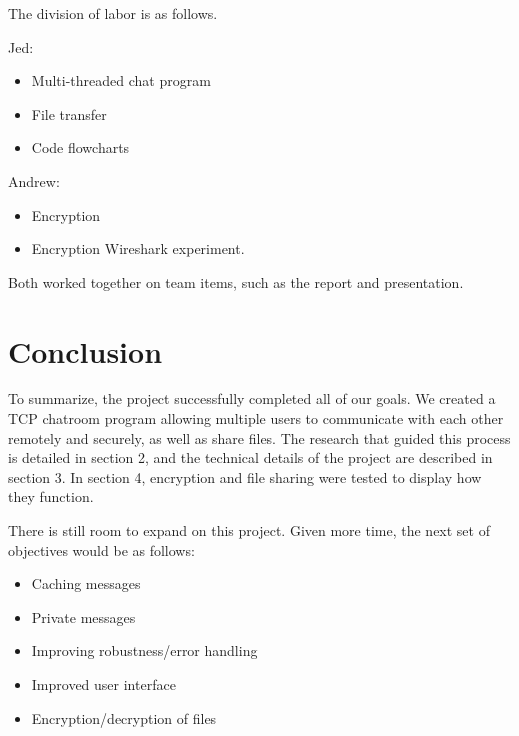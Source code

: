 \documentclass{article}
\begin{document}
The division of labor is as follows.

Jed:
\begin{itemize}
  \item Multi-threaded chat program
  \item File transfer
  \item Code flowcharts
\end{itemize}

Andrew: 
\begin{itemize}
  \item Encryption
  \item Encryption Wireshark experiment. 
\end{itemize}

Both worked together on team items, such as the report and presentation.

\section{Conclusion}

To summarize, the project successfully completed all of our goals. We created a TCP chatroom program allowing multiple users to communicate with each other remotely and securely, as well as share files. The research that guided this process is detailed in section 2, and the technical details of the project are described in section 3. In section 4, encryption and file sharing were tested to display how they function. 

There is still room to expand on this project. Given more time, the next set of objectives would be as follows: 
\begin{itemize}
  \item Caching messages
  \item Private messages
  \item Improving robustness/error handling
  \item Improved user interface
  \item Encryption/decryption of files
\end{itemize}



\end{document}

